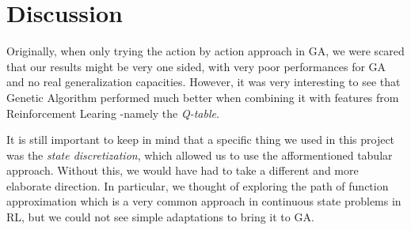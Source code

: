 \section{Discussion}
Originally, when only trying the action by action approach in GA, we were scared that our results might be very one sided, with very poor performances for GA and no real generalization capacities.
However, it was very interesting to see that Genetic Algorithm performed much better when combining it with features from Reinforcement Learing -namely the \textit{Q-table}.

It is still important to keep in mind that a specific thing we used in this project was the \textit{state discretization}, which allowed us to use the afformentioned tabular approach.
Without this, we would have had to take a different and more elaborate direction. In particular, we thought of exploring the path of function approximation which is a very common approach in continuous state problems in RL, but we could not see simple adaptations to bring it to GA.
